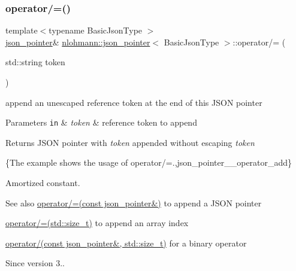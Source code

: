 \subsubsection{\texorpdfstring{operator/=()}{operator/=()}\hspace{0.1cm}{\footnotesize\ttfamily [2/3]}}
{\footnotesize\ttfamily template$<$typename Basic\+Json\+Type $>$ \\
\hyperlink{classnlohmann_1_1json__pointer}{json\+\_\+pointer}\& \hyperlink{classnlohmann_1_1json__pointer}{nlohmann\+::json\+\_\+pointer}$<$ Basic\+Json\+Type $>$\+::operator/= (\begin{DoxyParamCaption}\item[{std\+::string}]{token }\end{DoxyParamCaption})\hspace{0.3cm}{\ttfamily [inline]}}



append an unescaped reference token at the end of this J\+S\+ON pointer 


\begin{DoxyParams}[1]{Parameters}
\mbox{\tt in}  & {\em token} & reference token to append \\
\hline
\end{DoxyParams}
\begin{DoxyReturn}{Returns}
J\+S\+ON pointer with {\itshape token} appended without escaping {\itshape token} 
\end{DoxyReturn}
\{The example shows the usage of {\ttfamily operator/=}.,json\+\_\+pointer\+\_\+\+\_\+operator\+\_\+add\}

Amortized constant.

\begin{DoxySeeAlso}{See also}
\hyperlink{classnlohmann_1_1json__pointer_a7395bd0af29ac23fd3f21543c935cdfa}{operator/=(const json\+\_\+pointer\&)} to append a J\+S\+ON pointer 

\hyperlink{classnlohmann_1_1json__pointer_a64c8401529131bad1e486d91d703795f}{operator/=(std\+::size\+\_\+t)} to append an array index 

\hyperlink{classnlohmann_1_1json__pointer_a9f6bc6f4d4668b4e9a19d8b8ac29da4f}{operator/(const json\+\_\+pointer\&, std\+::size\+\_\+t)} for a binary operator
\end{DoxySeeAlso}
\begin{DoxySince}{Since}
version 3.. 
\end{DoxySince}
\mbox{\label{classnlohmann_1_1json__pointer_a64c8401529131bad1e486d91d703795f}} 
